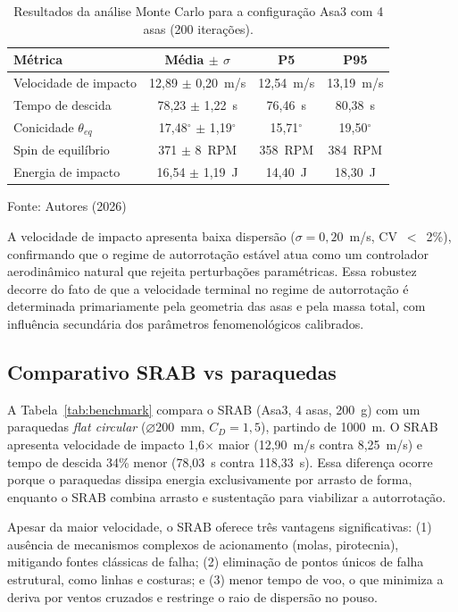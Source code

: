 \begin{table}[htbp]
\caption{Resultados da análise Monte Carlo para a configuração Asa3 com 4 asas (200 iterações).}
\centering
\begin{tabular*}{\textwidth}{@{\extracolsep{\fill}}lccc}
\hline
Métrica & Média $\pm$ $\sigma$ & P5 & P95 \\
\hline
Velocidade de impacto & 12,89 $\pm$ 0,20~m/s & 12,54~m/s & 13,19~m/s \\
Tempo de descida & 78,23 $\pm$ 1,22~s & 76,46~s & 80,38~s \\
Conicidade $\theta_{eq}$ & 17,48$^\circ$ $\pm$ 1,19$^\circ$ & 15,71$^\circ$ & 19,50$^\circ$ \\
Spin de equilíbrio & 371 $\pm$ 8~RPM & 358~RPM & 384~RPM \\
Energia de impacto & 16,54 $\pm$ 1,19~J & 14,40~J & 18,30~J \\
\hline
\end{tabular*}
{\footnotesize\centering Fonte: Autores (2026)\par}
\label{tab:mc}
\end{table}

A velocidade de impacto apresenta baixa dispersão ($\sigma = 0,20$~m/s, CV~$<$~2\%), confirmando que o regime de autorrotação estável atua como um controlador aerodinâmico natural que rejeita perturbações paramétricas. Essa robustez decorre do fato de que a velocidade terminal no regime de autorrotação é determinada primariamente pela geometria das asas e pela massa total, com influência secundária dos parâmetros fenomenológicos calibrados.

\subsection{Comparativo SRAB vs paraquedas}

A Tabela~\ref{tab:benchmark} compara o SRAB (Asa3, 4 asas, 200~g) com um paraquedas \textit{flat circular} ($\varnothing$200~mm, $C_D = 1,5$), partindo de 1000~m. O SRAB apresenta velocidade de impacto 1,6$\times$ maior (12,90~m/s contra 8,25~m/s) e tempo de descida 34\% menor (78,03~s contra 118,33~s). Essa diferença ocorre porque o paraquedas dissipa energia exclusivamente por arrasto de forma, enquanto o SRAB combina arrasto e sustentação para viabilizar a autorrotação.

Apesar da maior velocidade, o SRAB oferece três vantagens significativas: (1) ausência de mecanismos complexos de acionamento (molas, pirotecnia), mitigando fontes clássicas de falha; (2) eliminação de pontos únicos de falha estrutural, como linhas e costuras; e (3) menor tempo de voo, o que minimiza a deriva por ventos cruzados e restringe o raio de dispersão no pouso.

